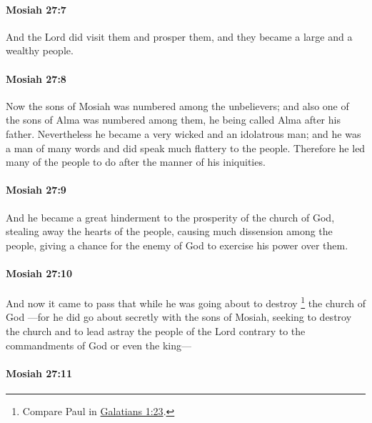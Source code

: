 		\paragraph{Mosiah 27:7} %
			\label{MOSIAH-27-7}

			And the Lord did visit them and prosper them,
			and they became a large and a wealthy people.

		\paragraph{Mosiah 27:8} %
			\label{MOSIAH-27-8}

			Now the sons of Mosiah was numbered among the unbelievers;
			and also one of the sons of Alma was numbered among them,
			he being called Alma after his father.
			Nevertheless he became a very wicked and an idolatrous man;
			and he was a man of many words and did speak much flattery to the people.
			Therefore he led many of the people to do after the manner of his iniquities.

		\paragraph{Mosiah 27:9} %
			\label{MOSIAH-27-9}

			And he became a great hinderment to the prosperity of the church of God,
			stealing away the hearts of the people,
			causing much dissension among the people,
			giving a chance for the enemy of God to exercise his power over them.

		\paragraph{Mosiah 27:10} %
			\label{MOSIAH-27-10}

			And now it came to pass that
			while he was going about to destroy%
				\footnote{%
					Compare Paul in \hyperref[GALATIANS-1-23]{Galatians 1:23}.
					}
			the church of God
			---for he did go about secretly with the sons of Mosiah,
			seeking to destroy the church
			and to lead astray the people of the Lord
			contrary to the commandments of God or even the king---

		\paragraph{Mosiah 27:11} %
			\label{MOSIAH-27-11}

